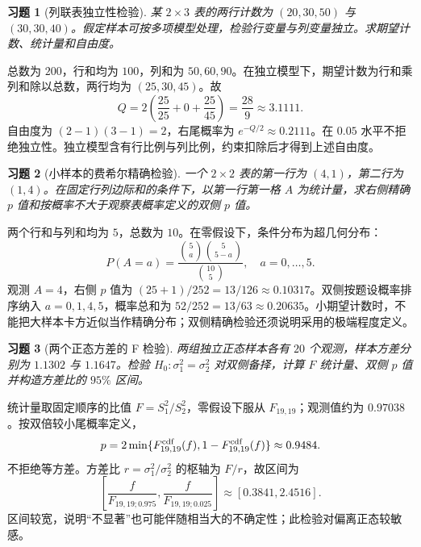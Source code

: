 \documentclass[12pt,fontset=fandol]{ctexart}
\newtheorem{exercise}{习题}[section]
\begin{document}
\begin{exercise}[列联表独立性检验]\label{q:B15.3}
某 $2\times3$ 表的两行计数为 $(20,30,50)$ 与 $(30,30,40)$。假定样本可按多项模型处理，检验行变量与列变量独立。求期望计数、统计量和自由度。\par{}
\end{exercise}

\begin{solve}\label{a:B15.3}总数为 $200$，行和均为 $100$，列和为 $50,60,90$。在独立模型下，期望计数为行和乘列和除以总数，两行均为 $(25,30,45)$。故\[Q=2\left(\frac{25}{25}+0+\frac{25}{45}\right)=\frac{28}{9}\approx3.1111.\]自由度为 $(2-1)(3-1)=2$，右尾概率为 $e^{-Q/2}\approx0.2111$。在 $0.05$ 水平不拒绝独立性。独立模型含有行比例与列比例，约束扣除后才得到上述自由度。\end{solve}

\begin{exercise}[小样本的费希尔精确检验]\label{q:B15.4}
一个 $2\times2$ 表的第一行为 $(4,1)$，第二行为 $(1,4)$。在固定行列边际和的条件下，以第一行第一格 $A$ 为统计量，求右侧精确 $p$ 值和按概率不大于观察表概率定义的双侧 $p$ 值。\par{}
\end{exercise}

\begin{solve}\label{a:B15.4}两个行和与列和均为 $5$，总数为 $10$。在零假设下，条件分布为超几何分布：\[P(A=a)=\frac{\binom5a\binom5{5-a}}{\binom{10}5},\quad a=0,\ldots,5.\]观测 $A=4$，右侧 $p$ 值为 $(25+1)/252=13/126\approx0.10317$。双侧按题设概率排序纳入 $a=0,1,4,5$，概率总和为 $52/252=13/63\approx0.20635$。小期望计数时，不能把大样本卡方近似当作精确分布；双侧精确检验还须说明采用的极端程度定义。\end{solve}

\begin{exercise}[两个正态方差的 F 检验]\label{q:M-P9-5}
两组独立正态样本各有 $20$ 个观测，样本方差分别为 $1.1302$ 与 $1.1647$。检验 $H_0:\sigma_1^2=\sigma_2^2$ 对双侧备择，计算 $F$ 统计量、双侧 $p$ 值并构造方差比的 $95\%$ 区间。\par{}
\end{exercise}

\begin{solve}\label{a:M-P9-5}统计量取固定顺序的比值 $F=S_1^2/S_2^2$，零假设下服从 $F_{19,19}$；观测值约为 $0.97038$。按双倍较小尾概率定义，\[p=2\min\{F_{19,19}^{\rm cdf}(f),1-F_{19,19}^{\rm cdf}(f)\}\approx0.9484.\]不拒绝等方差。方差比 $r=\sigma_1^2/\sigma_2^2$ 的枢轴为 $F/r$，故区间为\[\left[\frac{f}{F_{19,19;0.975}},\frac{f}{F_{19,19;0.025}}\right]\approx[0.3841,2.4516].\]区间较宽，说明“不显著”也可能伴随相当大的不确定性；此检验对偏离正态较敏感。\end{solve}
\end{document}
